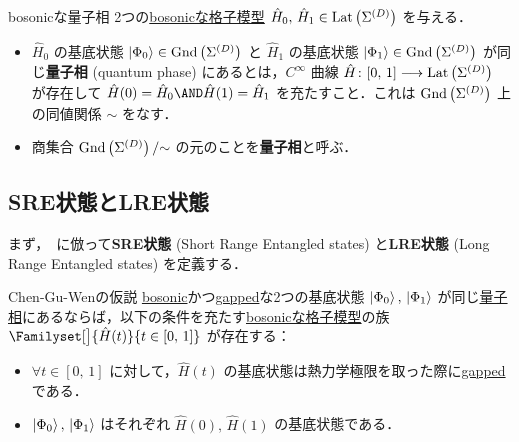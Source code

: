 \documentclass[TQFT_main]{subfiles}
\begin{document}
\begin{mydef}[label=def:quantum-phase]{bosonicな量子相}
    2つの\hyperref[def:bosonic-lattice-model]{bosonicな格子模型} $\hat{H}_0,\, \hat{H}_1 \in \mathrm{Lat}\left(\Sigma^{(D)}\right)$ を与える．

    \begin{itemize}
        \item $\hat{H}_0$ の基底状態 $\ket{\Phi_0} \in \mathrm{Gnd}\left(\Sigma^{(D)}\right)$ と $\hat{H}_1$ の基底状態 $\ket{\Phi_1} \in \mathrm{Gnd}\left(\Sigma^{(D)}\right)$ が同じ\textbf{量子相} (quantum phase) にあるとは，$C^\infty$ 曲線 $\hat{H} \colon [0,\, 1] \longrightarrow \mathrm{Lat}\left(\Sigma^{(D)}\right)$ が存在して
            $\hat{H}(0) = \hat{H}_0 \AND \hat{H}(1) = \hat{H}_1$ を充たすこと．これは $\mathrm{Gnd}\left(\Sigma^{(D)}\right)$ 上の同値関係 $\sim$ をなす．
        \item 商集合 $\mathrm{Gnd}\left(\Sigma^{(D)}\right)/{\sim}$ の元のことを\textbf{量子相}と呼ぶ．
    \end{itemize}
    
\end{mydef}


\subsection{SRE状態とLRE状態}

まず，~\cite[p.3]{ChenGuWen2010}に倣って\textbf{SRE状態} (Short Range Entangled states) と\textbf{LRE状態} (Long Range Entangled states) を定義する．
~\cite[p.4]{ChenGuWen2010}
\begin{myconj}[label=conj:CGW]{Chen-Gu-Wenの仮説}
    \hyperref[def:bosonic-lattice-model]{bosonic}かつ\hyperref[def:gapped]{gapped}な2つの基底状態 $\ket{\Phi_0},\, \ket{\Phi_1}$ が同じ\hyperref[def:quantum-phase]{量子相}にあるならば，以下の条件を充たす\hyperref[def:bosonic-lattice-model]{bosonicな格子模型}の族 $\Familyset[\big]{\hat{H}(t)}{t \in [0,\, 1]}$ が存在する：
    \begin{itemize}
        \item $\forall t \in [0,\, 1]$ に対して，$\hat{H}(t)$ の基底状態は熱力学極限を取った際に\hyperref[def:gapped]{gapped}である．
        \item $\ket{\Phi_0},\, \ket{\Phi_1}$ はそれぞれ $\hat{H}(0),\, \hat{H}(1)$ の基底状態である．
    \end{itemize}
\end{myconj}
\end{document}
